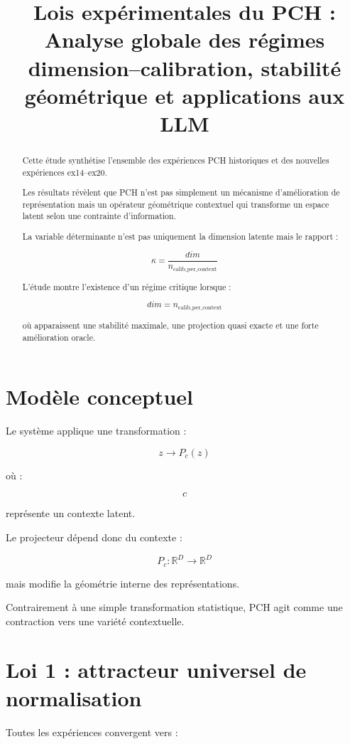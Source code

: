 \documentclass[11pt]{article}
\title{
Lois expérimentales du PCH :
Analyse globale des régimes dimension--calibration,
stabilité géométrique et applications aux LLM
}
\author{}
\date{}
\begin{document}
\maketitle


\begin{abstract}

Cette étude synthétise l'ensemble des expériences PCH historiques
et des nouvelles expériences ex14--ex20.

Les résultats révèlent que PCH n'est pas simplement un mécanisme
d'amélioration de représentation mais un opérateur géométrique
contextuel qui transforme un espace latent selon une contrainte
d'information.

La variable déterminante n'est pas uniquement la dimension latente
mais le rapport :

\[
\kappa =
\frac{dim}{n_{\mathrm{calib\_per\_context}}}
\]

L'étude montre l'existence d'un régime critique lorsque :

\[
dim=n_{\mathrm{calib\_per\_context}}
\]

où apparaissent une stabilité maximale, une projection quasi exacte
et une forte amélioration oracle.

\end{abstract}


\section{Modèle conceptuel}

Le système applique une transformation :

\[
z \rightarrow P_c(z)
\]

où :

\[
c
\]

représente un contexte latent.

Le projecteur dépend donc du contexte :

\[
P_c:\mathbb{R}^{D}\rightarrow\mathbb{R}^{D}
\]

mais modifie la géométrie interne des représentations.


Contrairement à une simple transformation statistique,
PCH agit comme une contraction vers une variété contextuelle.


\section{Loi 1 : attracteur universel de normalisation}


Toutes les expériences convergent vers :
\end{document}

